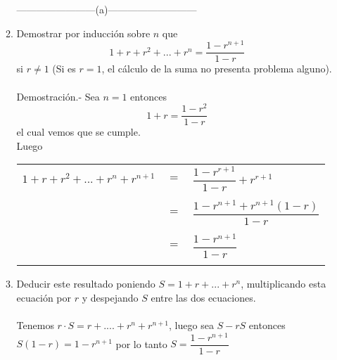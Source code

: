 \begin{enumerate}[\bfseries 1.]
\begin{enumerate}[\bfseries (a)]
     ------------------------(a)---------------------------
      \item Demostrar por inducción sobre $n$ que $$1 + r +r^2 + ... + r^n = \dfrac{1 - r^{n+1}}{1-r}$$ si $r\neq 1$ (Si es $r=1$, el cálculo de la suma no presenta problema alguno).\\\\
      Demostración.- \; Sea $n=1$ entonces $$1+r = \dfrac{1- r^2}{1-r}$$ el cual vemos que se cumple.\\
      Luego
      \begin{center}
      \begin{tabular}{r c l}
      $1+r+r^2 + ... + r^n + r^{n+1}$&$=$&$\dfrac{1- r^{r+1}}{1-r} + r^{r+1}$\\\\
      &$=$&$\dfrac{1 - r^{n+1} + r^{n+1} (1-r)}{1-r}$\\\\
      &$=$&$\dfrac{1 - r^{n+1}}{1-r}$\\\\
      \end{tabular}
      \end{center} 

      \item Deducir este resultado poniendo $S=1+r+...+r^n$, multiplicando esta ecuación por $r$ y despejando $S$ entre las dos ecuaciones.\\\\
      Tenemos $r\cdot S = r + .... + r^n + r^{n+1}$, luego sea $S - rS$ entonces $S(1-r) = 1-r^{n+1}$ por lo tanto $S = \dfrac{1-r^{n+1}}{1-r}$\\\\
      \end{enumerate}


\end{enumerate}
